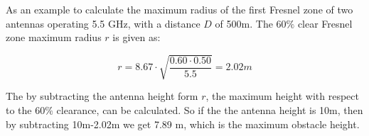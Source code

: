 \begin{where}
\end{where}

As an example to calculate the maximum radius of the first Fresnel zone of two antennas operating 5.5 GHz, with a distance $D$ of 500m. The 60$\%$ clear Fresnel zone maximum radius $r$ is given as:

\begin{equation}
r = 8.67 \cdot \sqrt{\frac{0.60 \cdot 0.50}{5.5}} = 2.02 m
\label{fres:eq_ex}
\end{equation}

The by subtracting the antenna height form $r$, the maximum height with respect to the 60$\%$ clearance, can be calculated. So if the the antenna height is 10m, then by subtracting 10m-2.02m we get 7.89 m, which is the maximum obstacle height.  %













 





